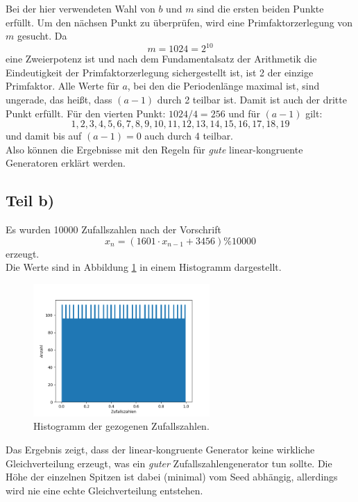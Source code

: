 Bei der hier verwendeten Wahl von $b$ und $m$ sind die ersten beiden Punkte erfüllt.
Um den nächsen Punkt zu überprüfen, wird eine Primfaktorzerlegung von $m$ gesucht.
Da
\begin{equation*}
  m=1024=2^{10}
\end{equation*}
eine Zweierpotenz ist und nach dem Fundamentalsatz der Arithmetik die Eindeutigkeit
der Primfaktorzerlegung sichergestellt ist, ist 2 der einzige Primfaktor.
Alle Werte für $a$, bei den die Periodenlänge maximal ist, sind ungerade, das heißt,
dass $(a-1)$ durch 2 teilbar ist. Damit ist auch der dritte Punkt erfüllt.
Für den vierten Punkt: $1024/4=256$ und für $(a-1)$ gilt:
\begin{equation*}
  1,2,3,4,5,6,7,8,9,10,11,12,13,14,15,16,17,18,19
\end{equation*}
und damit bis auf $(a-1)=0$ auch durch 4 teilbar.\\
Also können die Ergebnisse mit den Regeln für \textit{gute} linear-kongruente
Generatoren erklärt werden.
\subsection{Teil b)}
Es wurden 10000 Zufallszahlen nach der Vorschrift
\begin{equation*}
  x_n=(1601\cdot x_{n-1}+3456)\%10000
\end{equation*}
erzeugt.\\
Die Werte sind in Abbildung \ref{fig:Hist2b} in einem Histogramm dargestellt.
\begin{figure}[H]
  \centering
  \includegraphics[width=0.6\textwidth]{plots/Zufallszahlen2b.png}
  \caption{Histogramm der gezogenen Zufallszahlen.}
  \label{fig:Hist2b}
\end{figure}
Das Ergebnis zeigt, dass der linear-kongruente Generator keine wirkliche Gleichverteilung
erzeugt, was ein \textit{guter} Zufallszahlengenerator tun sollte.
Die Höhe der einzelnen Spitzen ist dabei (minimal) vom Seed abhängig, allerdings
wird nie eine echte Gleichverteilung entstehen.
